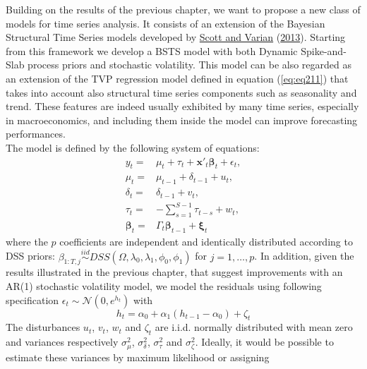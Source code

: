 \documentclass[
  12pt,
]{book}
\theoremstyle{break}
\theoremstyle{nonumberplain}
\begin{document}
Building on the results of the previous chapter, we want to propose a
new class of models for time series analysis. It consists of an
extension of the Bayesian Structural Time Series models developed by
\protect\hyperlink{ref-scott_varian_2013}{Scott and Varian}
(\protect\hyperlink{ref-scott_varian_2013}{2013}). Starting from this
framework we develop a BSTS model with both Dynamic Spike-and-Slab
process priors and stochastic volatility. This model can be also
regarded as an extension of the TVP regression model defined in equation
(\ref{eq:eq211}) that takes into account also structural time series
components such as seasonality and trend. These features are indeed
usually exhibited by many time series, especially in macroeconomics, and
including them inside the model can improve forecasting performances.\\
The model is defined by the following system of equations:
\begin{equation}
   \begin{aligned}\label{eq:dssbsts1}
  y_{t} = & \mu_{t}+\tau_{t}+\boldsymbol{x}'_{t}\boldsymbol{\beta}_{t}+\epsilon_{t},\\
  \mu_{t} = & \mu_{t-1}+\delta_{t-1}+u_{t},\\
  \delta_{t} = & \delta_{t-1}+v_{t},\\
  \tau_{t} = & -\sum_{s=1}^{S-1}\tau_{t-s}+w_{t}, \\
  \boldsymbol{\beta}_{t} = & \Gamma_{t}\boldsymbol{\beta}_{t-1} + \boldsymbol{\xi}_{t} 
  \end{aligned}
  \end{equation} where the \(p\) coefficients are independent and
identically distributed according to DSS priors:
\(\beta_{1:T,j}\overset{iid}{\sim}DSS(\Omega,\lambda_{0},\lambda_1,\phi_0,\phi_1)\)
for \(j=1,\ldots,p\). In addition, given the results illustrated in the
previous chapter, that suggest improvements with an AR(1) stochastic
volatility model, we model the residuals using following specification
\(\epsilon_t\sim\mathcal{N}(0,e^{h_{t}})\) with
\begin{equation}\label{eq:dssbsts2}
h_{t}=\alpha_{0}+\alpha_{1}(h_{t-1}-\alpha_{0})+\zeta_{t}
\end{equation} The disturbances \(u_{t}\), \(v_{t}\), \(w_{t}\) and
\(\zeta_{t}\) are i.i.d. normally distributed with mean zero and
variances respectively \(\sigma^{2}_{\mu}\), \(\sigma^{2}_{\delta}\),
\(\sigma^{2}_{\tau}\) and \(\sigma^{2}_{\zeta}\). Ideally, it would be
possible to estimate these variances by maximum likelihood or assigning
\end{document}

